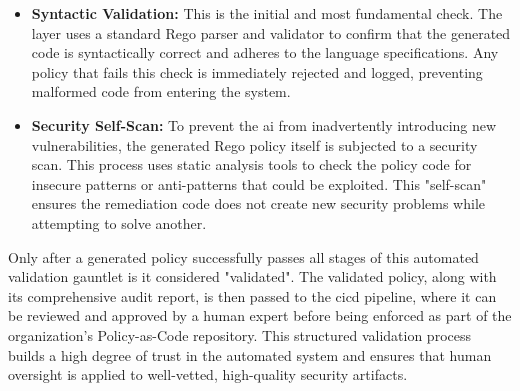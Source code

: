\begin{itemize}
    \item \textbf{Syntactic Validation:} This is the initial and most fundamental check. The layer uses a standard Rego parser and validator to confirm that the generated code is syntactically correct and adheres to the language specifications. Any policy that fails this check is immediately rejected and logged, preventing malformed code from entering the system.
    \item \textbf{Security Self-Scan:} To prevent the \gls{ai} from inadvertently introducing new vulnerabilities, the generated Rego policy itself is subjected to a security scan. This process uses static analysis tools to check the policy code for insecure patterns or anti-patterns that could be exploited. This "self-scan" ensures the remediation code does not create new security problems while attempting to solve another.
\end{itemize}

Only after a generated policy successfully passes all stages of this automated validation gauntlet is it considered "validated". The validated policy, along with its comprehensive audit report, is then passed to the \gls{cicd} pipeline, where it can be reviewed and approved by a human expert before being enforced as part of the organization's Policy-as-Code repository. This structured validation process builds a high degree of trust in the automated system and ensures that human oversight is applied to well-vetted, high-quality security artifacts.

